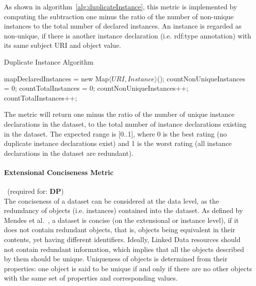 As shown in algorithm~\ref{alg:duplicateInstance}, this metric is implemented by computing the subtraction one minus the ratio of the number of non-unique instances to the total number of declared instances. An instance is regarded as non-unique, if there is another instance declaration (i.e. rdf:type annotation) with its same subject URI and object value.
\begin{algorithm}
\caption{Duplicate Instance Algorithm} \label{alg:duplicateInstance}
\begin{algorithmic}[1]
\State mapDeclaredInstances = new Map$\langle URI, Instance\rangle$();
\State countNonUniqueInstances = 0;
\State countTotalInstances = 0;
\EndProcedure
{}
countNonUniqueInstances++; 
\EndIf
\State countTotalInstances++;  ~\\
\EndProcedure
\end{algorithmic}
\end{algorithm}
The metric will return one minus the ratio of the number of unique instance declarations in the dataset, to the total number of instance declarations existing in the dataset. The expected range is [0..1], where 0 is the best rating (no duplicate instance declarations exist) and 1 is the worst rating (all instance declarations in the dataset are redundant).


\paragraph{Extensional Conciseness Metric}~(required for: \textbf{DP})~\\ 
The conciseness of a dataset can be considered at the data level, as the redundancy of objects (i.e. instances) contained into the dataset. As defined by Mendes et al.~\cite{Mendes2012}, a dataset is concise (on the extensional or instance level), if it does not contain redundant objects, that is, objects being equivalent in their contents, yet having different identifiers.
Ideally, Linked Data resources should not contain redundant information, which implies that all the objects described by them should be unique. Uniqueness of objects is determined from their properties: one object is said to be unique if and only if there are no other objects with the same set of properties and corresponding values.

